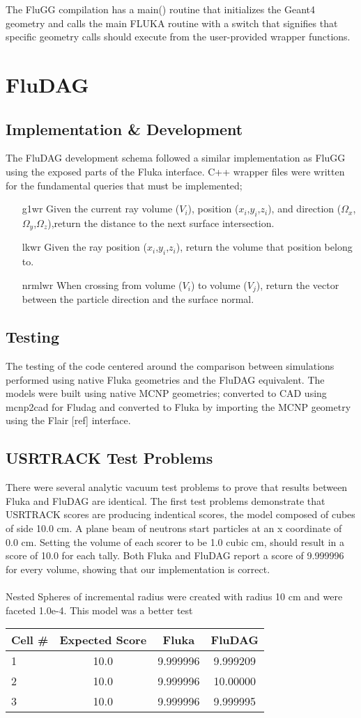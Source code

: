 \documentclass{anstrans}
\begin{document}
The FluGG compilation has a main() routine that initializes the Geant4 geometry and calls the main FLUKA routine with a switch that signifies that specific geometry calls should execute from the user-provided wrapper functions.
\section{FluDAG}
\subsection{Implementation \& Development}
The FluDAG development schema followed a similar implementation as FluGG using the exposed parts of the Fluka interface. C++ wrapper files were written for the fundamental queries that must be implemented;
\begin{itemize}
\item[g1wr]{Given the current ray volume ($V_i$), position ($x_i$,$y_i$,$z_i$), and direction ($\Omega_x$,$\Omega_y$,$\Omega_z$),return the distance to the next surface intersection.}
\item[lkwr]{Given the ray position ($x_i$,$y_i$,$z_i$), return the volume that position belong to.}	
\item[nrmlwr]{When crossing from volume ($V_i$) to volume ($V_j$), return
the vector between the particle direction and the surface normal.}
\end{itemize}
\subsection{Testing}
The testing of the code centered around the comparison between simulations performed using native Fluka geometries and the FluDAG equivalent. The models were built using native MCNP geometries; converted to CAD using mcnp2cad for Fludag and converted to Fluka by importing the MCNP geometry using the Flair [ref] interface.
\subsection*{USRTRACK Test Problems}
There were several analytic vacuum test problems to prove that results between Fluka and FluDAG are identical. The first test problems demonstrate that USRTRACK scores are producing indentical scores, the model composed of cubes of side 10.0 cm. A plane beam of neutrons start particles at an x coordinate of 0.0 cm. Setting the volume of each scorer to be 1.0 cubic cm, should result in a score of 10.0 for each tally. Both Fluka and FluDAG report a score of 9.999996 for every volume, showing that our implementation 
is correct.
\\
\\
Nested Spheres of incremental radius were created with radius 10 cm and were faceted 1.0e-4. This model was a better test 
\begin{tabular}{l|c|c|c}
Cell \# & Expected Score & Fluka  & FluDAG \\
\hline
1 & 10.0 & 9.999996 & 9.999209 \\
2 & 10.0 & 9.999996 & 10.00000 \\
3 & 10.0 & 9.999996 & 9.999995 \\
\end{tabular}
\end{document}
